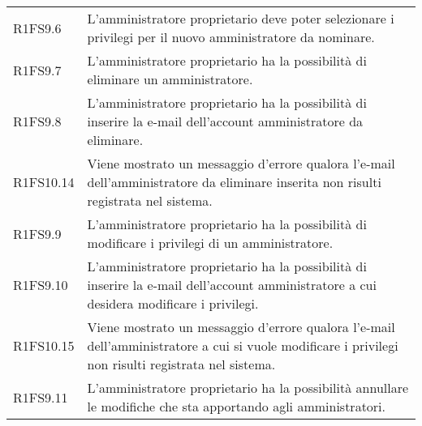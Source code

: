 {\begin{longtable}{ >{\centering}p{} >{}p{}}
R1FS9.6 & L'amministratore proprietario deve poter selezionare i privilegi per il nuovo amministratore da nominare. \\

R1FS9.7 & L'amministratore proprietario ha la possibilità di eliminare un amministratore. \\

R1FS9.8 & L'amministratore proprietario ha la possibilità di inserire la e-mail dell'account amministratore da eliminare. \\

R1FS10.14 & Viene mostrato un messaggio d'errore qualora l'e-mail dell'amministratore da eliminare inserita non risulti registrata nel sistema. \\

R1FS9.9 & L'amministratore proprietario ha la possibilità di modificare i privilegi di un amministratore. \\

R1FS9.10 & L'amministratore proprietario ha la possibilità di inserire la e-mail dell'account amministratore a cui desidera modificare i privilegi. \\

R1FS10.15 & Viene mostrato un messaggio d'errore qualora l'e-mail dell'amministratore a cui si vuole modificare i privilegi non risulti registrata nel sistema. \\

R1FS9.11 & L'amministratore proprietario ha la possibilità annullare le modifiche che sta apportando agli amministratori. \\

\end{longtable}
}
